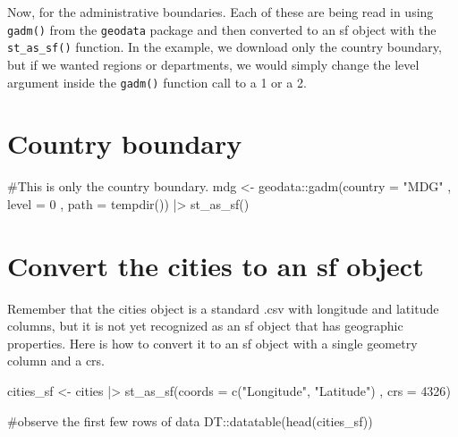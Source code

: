 \documentclass[
  letterpaper,
  DIV=11,
  numbers=noendperiod]{scrreprt}
\newenvironment{Shaded}{\begin{snugshade}}{\end{snugshade}}
\newcommand{\AttributeTok}[1]{\textcolor[rgb]{0.40,0.45,0.13}{#1}}
\newcommand{\CommentTok}[1]{\textcolor[rgb]{0.37,0.37,0.37}{#1}}
\newcommand{\DecValTok}[1]{\textcolor[rgb]{0.68,0.00,0.00}{#1}}
\newcommand{\FunctionTok}[1]{\textcolor[rgb]{0.28,0.35,0.67}{#1}}
\newcommand{\NormalTok}[1]{\textcolor[rgb]{0.00,0.23,0.31}{#1}}
\newcommand{\OtherTok}[1]{\textcolor[rgb]{0.00,0.23,0.31}{#1}}
\newcommand{\SpecialCharTok}[1]{\textcolor[rgb]{0.37,0.37,0.37}{#1}}
\newcommand{\StringTok}[1]{\textcolor[rgb]{0.13,0.47,0.30}{#1}}
\begin{document}
Now, for the administrative boundaries. Each of these are being read in
using \texttt{gadm()} from the \texttt{geodata} package and then
converted to an sf object with the \texttt{st\_as\_sf()} function. In
the example, we download only the country boundary, but if we wanted
regions or departments, we would simply change the level argument inside
the \texttt{gadm()} function call to a 1 or a 2.

\section{Country boundary}\label{country-boundary}

\begin{Shaded}
\begin{Highlighting}[]
\CommentTok{\#This is only the country boundary. }
\NormalTok{mdg }\OtherTok{\textless{}{-}}\NormalTok{ geodata}\SpecialCharTok{::}\FunctionTok{gadm}\NormalTok{(}\AttributeTok{country =} \StringTok{"MDG"}
\NormalTok{                  , }\AttributeTok{level =} \DecValTok{0}
\NormalTok{                  , }\AttributeTok{path =} \FunctionTok{tempdir}\NormalTok{()) }\SpecialCharTok{|\textgreater{}}
  \FunctionTok{st\_as\_sf}\NormalTok{()}
\end{Highlighting}
\end{Shaded}

\section{Convert the cities to an sf
object}\label{convert-the-cities-to-an-sf-object}

Remember that the cities object is a standard .csv with longitude and
latitude columns, but it is not yet recognized as an sf object that has
geographic properties. Here is how to convert it to an sf object with a
single geometry column and a crs.

\begin{Shaded}
\begin{Highlighting}[]
\NormalTok{cities\_sf }\OtherTok{\textless{}{-}}\NormalTok{ cities }\SpecialCharTok{|\textgreater{}}
  \FunctionTok{st\_as\_sf}\NormalTok{(}\AttributeTok{coords =} \FunctionTok{c}\NormalTok{(}\StringTok{"Longitude"}\NormalTok{, }\StringTok{"Latitude"}\NormalTok{)}
\NormalTok{           , }\AttributeTok{crs =} \DecValTok{4326}\NormalTok{)}

\CommentTok{\#observe the first few rows of data}
\NormalTok{DT}\SpecialCharTok{::}\FunctionTok{datatable}\NormalTok{(}\FunctionTok{head}\NormalTok{(cities\_sf))}
\end{Highlighting}
\end{Shaded}
\end{document}
